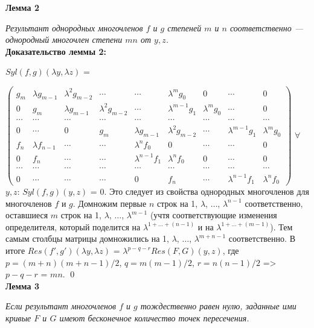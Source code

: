 \documentclass[a4paper, 12pt]{article}
\begin{document}
\textbf{Лемма 2}

\textit{Результант однородных многочленов $f$ и $g$ степеней $m$ и $n$ соответственно --- однородный многочлен степени $mn$ от $y,z$.}\\

\textbf{Доказательство леммы 2:}\newline

$Syl(f,g)(\lambda y,\lambda z)$ =

$\begin{pmatrix}
g_m & \lambda g_{m-1} & \lambda^{2} g_{m-2} & \cdots & \cdots & \lambda^{m}g_0 & 0 & \cdots & 0 \\
0 & g_m & \lambda g_{m-1} & \lambda^{2} g_{m-2} & \cdots & \lambda^{m-1} g_1 & \lambda^{m} g_0 & \cdots & 0 \\
\cdots & \cdots & \cdots & \cdots & \cdots & \cdots & \cdots & \cdots & \cdots \\
0 & \cdots & 0 & g_m & \lambda g_{m-1} & \lambda^{2} g_{m-2} & \cdots & \lambda^{m-1} g_1 & \lambda^{m} g_0 \\
f_n & \lambda f_{n-1} & \cdots & \cdots & \lambda^{n} f_0 & 0 & \cdots & \cdots & 0 \\
0 & f_n & \cdots & \cdots & \lambda^{n-1} f_1 & \lambda^{n} f_0 & 0 & \cdots & 0 \\
\cdots & \cdots & \cdots & \cdots & \cdots & \cdots & \cdots & \cdots & \cdots \\
0 & \cdots & \cdots & \cdots & 0 & f_n & \cdots & \lambda^{n-1} f_1 & \lambda^{n} f_0
\end{pmatrix}$\newline
$\forall$ $y,z$: $Syl(f,g)(y,z)$ = $0$. Это следует из свойства однородных многочленов для многочленов $f$ и $g$.
\newline
Домножим первые $n$ строк на 1, $\lambda$, $\dots$, $\lambda^{n-1}$ соответственно, оставшиеся $m$ строк на 1, $\lambda$, $\dots$, $\lambda^{m-1}$ (учтя соответствующие изменения определителя, который поделится на $\lambda^{1 +\dots + (n-1)}$ и на $\lambda^{1 +\dots + (m-1)}$).
Тем самым столбцы матрицы домножились на 1, $\lambda$, $\dots$, $\lambda^{m + n - 1}$ соответственно.\newline
В итоге $Res(f',g')(\lambda y,\lambda z)$ = $\lambda^{p-q-r}Res(F,G)(y,z)$, где $p = (m+n)(m+n-1)/2$, $q = m(m-1)/2 $, $r = n(n-1)/2$ => $p-q-r$ = $mn$.
\qed\\

\textbf{Лемма 3}

\textit{Если результант многочленов $f$ и $g$ тождественно равен нулю, заданные ими кривые $F$ и $G$ имеют бесконечное количество точек пересечения.}\\
\end{document}
